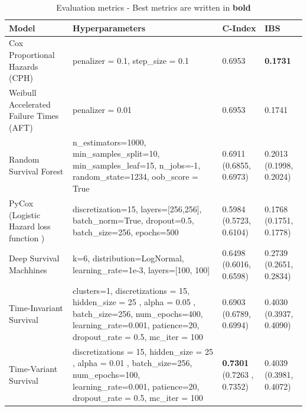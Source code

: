 \documentclass[%
 reprint,
 amsmath,amssymb,
 aps,nofootinbib
]{revtex4-2}
\begin{document}
\begin{table}[t]
  \centering
  \begin{tabular}{|p{4cm}|p{10cm}|p{1.5cm}|p{1.5cm}|}
     \hline
    \textbf{Model} & \textbf{Hyperparameters} & \textbf{C-Index} & \textbf{IBS} \\
    \hline
    Cox Proportional Hazards (CPH) & penalizer = 0.1, step\_size = 0.1 & 0.6953 & \textbf{0.1731}\\
    \hline
    Weibull Accelerated Failure Times (AFT) & penalizer = 0.01  & 0.6953 & 0.1741\\
    \hline
    Random Survival Forest & n\_estimators=1000, min\_samples\_split=10, min\_samples\_leaf=15, n\_jobs=-1, random\_state=1234, oob\_score = True  & 0.6911 (0.6855, 0.6973) & 0.2013 (0.1998, 0.2024)\\
    \hline
    PyCox (Logistic Hazard loss function \cite{kvamme_continuous_2019}) & discretization=15, layers=[256,256],  batch\_norm=True, dropout=0.5, batch\_size=256, epochs=500 & 0.5984 (0.5723, 0.6104)& 0.1768 (0.1751, 0.1778)\\
    \hline
    Deep Survival Machhines & k=6, distribution=LogNormal, learning\_rate=1e-3, layers=[100, 100] & 0.6498 (0.6016, 0.6598) & 0.2739 (0.2651, 0.2834)\\
    \hline
    Time-Invariant Survival & clusters=1, discretizations = 15, hidden\_size = 25 , alpha = 0.05 , batch\_size=256, num\_epochs=400, learning\_rate=0.001, patience=20, dropout\_rate = 0.5, mc\_iter = 100 & 0.6903 (0.6789, 0.6994) &0.4030 (0.3937, 0.4090) \\
    \hline
    Time-Variant Survival & discretizations = 15, hidden\_size = 25 , alpha = 0.01 , batch\_size=256, num\_epochs=100, learning\_rate=0.001, patience=20, dropout\_rate = 0.5, mc\_iter = 100  & \textbf{0.7301} (0.7263 , 0.7352) & 0.4039 (0.3981, 0.4072)\\
    \hline
  \end{tabular}
  \caption{Evaluation metrics - Best metrics are written in \textbf{bold}}
  \label{tab:eval}
\end{table}

\end{document}
